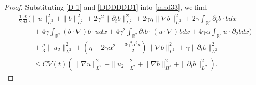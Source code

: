 \documentclass[reqno,11pt]{amsart}
\def\R{\mathbb R}
\numberwithin{Thm}{section}
\begin{document}
\begin{proof}
 Substituting \eqref{D-1} and \eqref{DDDDDD1} into \eqref{mhd33}, we find
\begin{align}\label{mhd333}
&\frac{1}{2}\frac{d}{dt}\Big(\|u\|^2_{L^2}+\|b\|^2_{L^2}+2\gamma^2\|\partial_tb\|^2_{L^2}+2\gamma\eta\|\nabla b\|^2_{L^2}+2\gamma\int_{\R^2}\partial_tb\cdot bdx\nonumber\\&\qquad+4\gamma\int_{\R^2}(b\cdot\nabla) b\cdot u dx+4\gamma^2\int_{\R^2}\partial_{t}b\cdot (u\cdot\nabla) bdx+4\gamma\alpha\int_{\R^2}u\cdot\partial_2 bdx
\Big)\nonumber\\
&\qquad+\frac{\mu}{3}\|u_2\|^2_{L^2}+(\eta-2\gamma\alpha^2-\frac{3\gamma^2\alpha^2\mu}{2})\|\nabla b\|^2_{L^2}+\gamma\|\partial_tb\|^2_{L^2}\nonumber\\
&\qquad\leq CV(t)\left(\|\nabla u\|_{L^{2}}^2+\|u_2\|_{L^2}^2+\|\nabla b\|_{H^1}^2+\|\partial_tb\|_{L^{2}}^2\right).
\end{align}










\end{proof}
\end{document}
